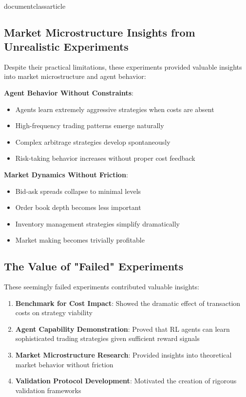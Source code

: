 \\documentclass{article}
\begin{document}
\subsection{Market Microstructure Insights from Unrealistic Experiments}

Despite their practical limitations, these experiments provided valuable insights into market microstructure and agent behavior:

\textbf{Agent Behavior Without Constraints}:
\begin{itemize}
\item Agents learn extremely aggressive strategies when costs are absent
\item High-frequency trading patterns emerge naturally
\item Complex arbitrage strategies develop spontaneously
\item Risk-taking behavior increases without proper cost feedback
\end{itemize}

\textbf{Market Dynamics Without Friction}:
\begin{itemize}
\item Bid-ask spreads collapse to minimal levels
\item Order book depth becomes less important
\item Inventory management strategies simplify dramatically
\item Market making becomes trivially profitable
\end{itemize}

\subsection{The Value of "Failed" Experiments}

These seemingly failed experiments contributed valuable insights:

\begin{enumerate}
\item \textbf{Benchmark for Cost Impact}: Showed the dramatic effect of transaction costs on strategy viability
\item \textbf{Agent Capability Demonstration}: Proved that RL agents can learn sophisticated trading strategies given sufficient reward signals
\item \textbf{Market Microstructure Research}: Provided insights into theoretical market behavior without friction
\item \textbf{Validation Protocol Development}: Motivated the creation of rigorous validation frameworks
\end{enumerate}
\end{document}
